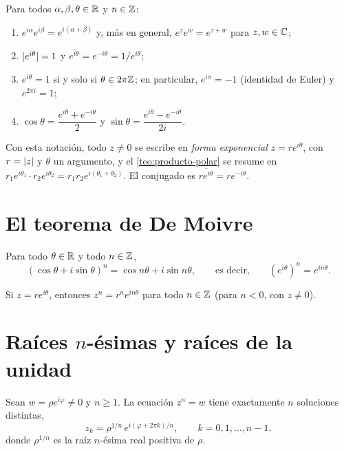 \begin{proposicion}\label{prop:exp}
Para todos $\alpha,\beta,\theta\in\mathbb{R}$ y $n\in\mathbb{Z}$:
\begin{enumerate}
  \item $e^{i\alpha}e^{i\beta}=e^{i(\alpha+\beta)}$ y, más en general, $e^{z}e^{w}=e^{z+w}$ para $z,w\in\mathbb{C}$;
  \item $\lvert e^{i\theta}\rvert=1$ y $\overline{e^{i\theta}}=e^{-i\theta}=1/e^{i\theta}$;
  \item $e^{i\theta}=1$ si y solo si $\theta\in2\pi\mathbb{Z}$; en particular, $e^{i\pi}=-1$ (identidad de Euler) y $e^{2\pi i}=1$;
  \item $\cos\theta=\dfrac{e^{i\theta}+e^{-i\theta}}{2}$ y $\sin\theta=\dfrac{e^{i\theta}-e^{-i\theta}}{2i}$.
\end{enumerate}
\end{proposicion}

Con esta notación, todo $z\ne0$ se escribe en \emph{forma exponencial} $z=re^{i\theta}$, con $r=\lvert z\rvert$ y $\theta$ un argumento, y el \cref{teo:producto-polar} se resume en $r_1e^{i\theta_1}\cdot r_2e^{i\theta_2}=r_1r_2e^{i(\theta_1+\theta_2)}$. El conjugado es $\overline{re^{i\theta}}=re^{-i\theta}$.

\section{El teorema de De Moivre}

\begin{teorema}[De Moivre]\label{teo:demoivre}
Para todo $\theta\in\mathbb{R}$ y todo $n\in\mathbb{Z}$,
\[
(\cos\theta+i\sin\theta)^{n}=\cos n\theta+i\sin n\theta,\qquad\text{es decir,}\qquad (e^{i\theta})^{n}=e^{in\theta}.
\]
\end{teorema}

\begin{corolario}
Si $z=re^{i\theta}$, entonces $z^{n}=r^{n}e^{in\theta}$ para todo $n\in\mathbb{Z}$ (para $n<0$, con $z\ne0$).
\end{corolario}

\addtocounter{definicion}{1}%

\section{Raíces \texorpdfstring{$n$}{n}-ésimas y raíces de la unidad}

\begin{teorema}\label{teo:raices}
Sean $w=\rho e^{i\varphi}\ne0$ y $n\ge1$. La ecuación $z^{n}=w$ tiene exactamente $n$ soluciones distintas,
\[
z_k=\rho^{1/n}\,e^{i(\varphi+2\pi k)/n},\qquad k=0,1,\dots,n-1,
\]
donde $\rho^{1/n}$ es la raíz $n$-ésima real positiva de $\rho$.
\end{teorema}

